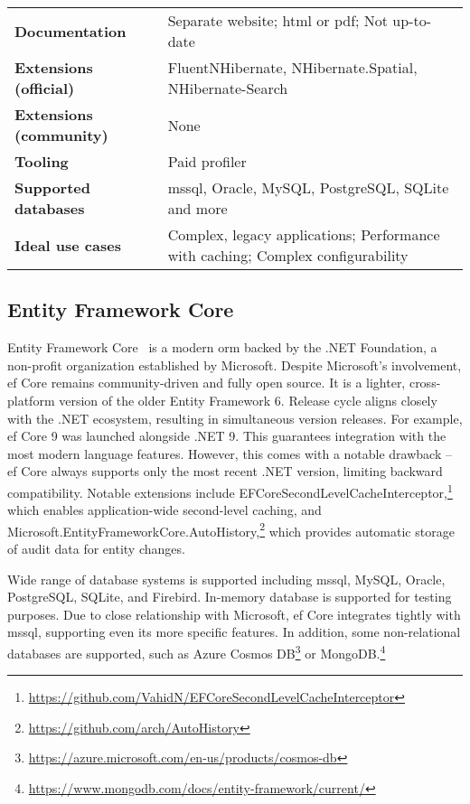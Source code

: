{\begin{landscape}
\begin{table}[p]
\begin{tabular}{
>{\raggedright\arraybackslash}p{40.00mm}
>{\arraybackslash}p{150.00mm}
}
\textbf{Documentation} & Separate website; \acrshort{html} or \acrshort{pdf}; Not up-to-date\\
\textbf{Extensions (official)} & FluentNHibernate, NHibernate.Spatial, NHibernate-Search  \\
\textbf{Extensions (community)} & None \\
\textbf{Tooling} & Paid profiler \\
\textbf{Supported databases} & \acrshort{mssql}, Oracle, MySQL, PostgreSQL, SQLite and more  \\
\textbf{Ideal use cases} & Complex, legacy applications; Performance with caching; Complex configurability \\
\bottomrule
\end{tabular}
\end{table}
\end{landscape}
}

\subsection{Entity Framework Core}
Entity Framework Core~\cite{efcore, efcoreRepo} is a modern \acrshort{orm} backed by the .NET Foundation, a non-profit organization established by Microsoft. Despite Microsoft's involvement, \acrshort{ef} Core remains community-driven and fully open source. It is a lighter, cross-platform version of the older Entity Framework 6. Release cycle aligns closely with the .NET ecosystem, resulting in simultaneous version releases. For example, \acrshort{ef} Core 9 was launched alongside .NET 9. This guarantees integration with the most modern language features. However, this comes with a notable drawback -- \acrshort{ef} Core always supports only the most recent .NET version, limiting backward compatibility. Notable extensions include EFCoreSecondLevelCacheInterceptor,\footnote{\url{https://github.com/VahidN/EFCoreSecondLevelCacheInterceptor}} which enables application-wide second-level caching, and Microsoft.EntityFrameworkCore.AutoHistory,\footnote{\url{https://github.com/arch/AutoHistory}} which provides automatic storage of audit data for entity changes.

Wide range of database systems is supported including \acrshort{mssql}, MySQL, Oracle, PostgreSQL, SQLite, and Firebird. In-memory database is supported for testing purposes. Due to close relationship with Microsoft, \acrshort{ef} Core integrates tightly with \acrshort{mssql}, supporting even its more specific features. In addition, some non-relational databases are supported, such as Azure Cosmos DB\footnote{\url{https://azure.microsoft.com/en-us/products/cosmos-db}} or MongoDB.\footnote{\url{https://www.mongodb.com/docs/entity-framework/current/}}

